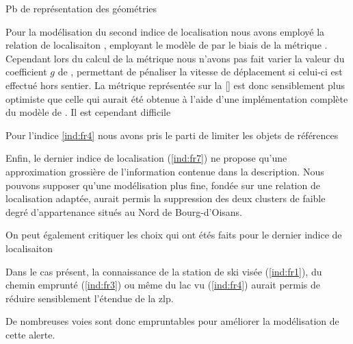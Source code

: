 Pb de représentation des géométries

Pour la modélisation du second indice de localisation nous avons
employé la relation de localisaiton
, employant le modèle de
\textcite{Tobler1993} par le biais de la métrique
. Cependant lors du calcul de la métrique
nous n'avons pas fait varier la valeur du coefficient \(g\) de
\textcite{Tobler1993}, permettant de pénaliser la vitesse de
déplacement si celui-ci est effectué hors sentier. La métrique
représentée sur la \autoref{} est donc sensiblement plus optimiste que
celle qui aurait été obtenue à l'aide d'une implémentation complète du
modèle de \textcite{Tobler1993}.
%
Il est cependant difficile

Pour l'indice \ref{ind:fr4} nous avons pris le parti de limiter les
objets de références

Enfin, le dernier indice de localisation (\ref{ind:fr7}) ne propose
qu'une approximation grossière de l'information contenue dans la
description.
%
Nous pouvons supposer qu'une modélisation plus fine, fondée sur une
relation de localisation adaptée, aurait permis la suppression des
deux clusters de faible degré d'appartenance situés au Nord de
Bourg-d'Oisans.


On peut également critiquer les choix qui ont étés faits pour le
dernier indice de localisaiton

Dans le cas présent, la connaissance de la station de ski visée
(\ref{ind:fr1}), du chemin emprunté (\ref{ind:fr3}) ou même du lac vu
(\ref{ind:fr4}) aurait permis de réduire sensiblement l'étendue de la
\ac{zlp}.

De nombreuses voies sont donc empruntables pour améliorer la
modélisation de cette alerte.


